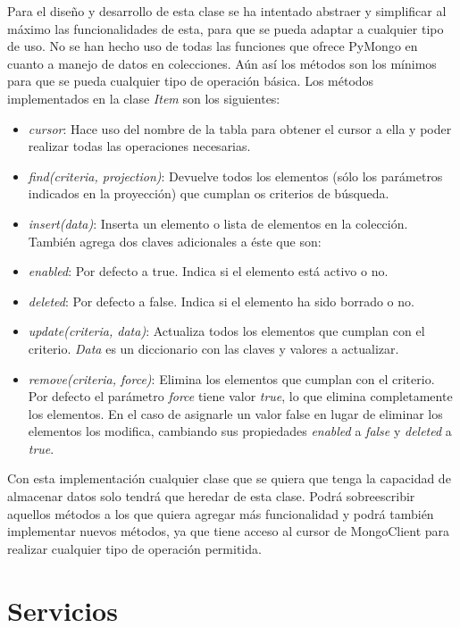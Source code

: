 \bigskip
Para el diseño y desarrollo de esta clase se ha intentado abstraer y simplificar al máximo las funcionalidades de esta, para que se pueda adaptar a cualquier tipo de uso. No se han hecho uso de todas las funciones que ofrece PyMongo en cuanto a manejo de datos en colecciones. Aún así los métodos son los mínimos para que se pueda cualquier tipo de operación básica. Los métodos implementados en la clase \textit{Item} son los siguientes:
\begin{itemize}
	\item \textit{cursor}: Hace uso del nombre de la tabla para obtener el cursor a ella y poder realizar todas las operaciones necesarias.
	\item \textit{find(criteria, projection)}: Devuelve todos los elementos (sólo los parámetros indicados en la proyección) que cumplan os criterios de búsqueda.
	\item \textit{insert(data)}: Inserta un elemento o lista de elementos en la colección. También agrega dos claves adicionales a éste que son:
	\item \textit{enabled}: Por defecto a true. Indica si el elemento está activo o no.
	\item \textit{deleted}: Por defecto a false. Indica si el elemento ha sido borrado o no.
	\item \textit{update(criteria, data)}: Actualiza todos los elementos que cumplan con el criterio. \textit{Data} es un diccionario con las claves y valores a actualizar.
	\item \textit{remove(criteria, force)}: Elimina los elementos que cumplan con el criterio. Por defecto el parámetro \textit{force} tiene valor \textit{true}, lo que elimina completamente los elementos. En el caso de asignarle un valor false en lugar de eliminar los elementos los modifica, cambiando sus propiedades \textit{enabled} a \textit{false} y \textit{deleted} a \textit{true}.
\end{itemize}



\bigskip
Con esta implementación cualquier clase que se quiera que tenga la capacidad de almacenar datos solo tendrá que heredar de esta clase. Podrá sobreescribir aquellos métodos a los que quiera agregar más funcionalidad y podrá también implementar nuevos métodos, ya que tiene acceso al cursor de MongoClient para realizar cualquier tipo de operación permitida.




\section{Servicios}


